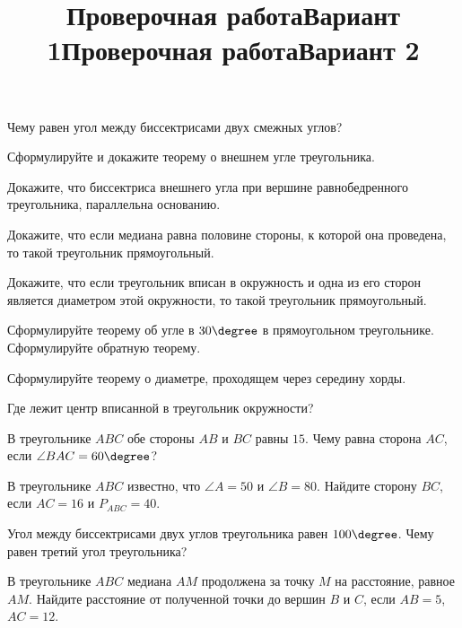 \newpage
\title{Проверочная работа}
\title{Вариант 1}
\begin{listofex}
	\item
	\begin{enumcols}[itemcolumns=1]
		\item Чему равен угол между биссектрисами двух смежных углов?
		\item Сформулируйте и докажите теорему о внешнем угле треугольника.
		\item Докажите, что биссектриса внешнего угла при вершине равнобедренного треугольника, параллельна основанию.
		\item Докажите, что если медиана равна половине стороны, к которой она проведена, то такой треугольник прямоугольный.
		\item Докажите, что если треугольник вписан в окружность и одна из его сторон является диаметром этой окружности, то такой треугольник прямоугольный.
		\item Сформулируйте теорему об угле в \( 30\degree \) в прямоугольном треугольнике. Сформулируйте обратную теорему.
		\item Сформулируйте теорему о диаметре, проходящем через середину хорды.
		\item Где лежит центр вписанной в треугольник окружности?
	\end{enumcols}
	\item В треугольнике \( ABC \) обе стороны \( AB \) и \( BC \) равны \( 15 \). Чему равна сторона \( AC \), если \( \angle BAC = 60 \degree \)?
	\item В треугольнике \( ABC \) известно, что \( \angle A = 50 \) и \( \angle B = 80 \). Найдите сторону \( BC \), если \( AC = 16 \) и \( P_{ABC}=40 \).
	\item Угол между биссектрисами двух углов треугольника равен \( 100\degree \). Чему равен третий угол треугольника?
	\item {}
	\item {}
	\item В треугольнике \( ABC \) медиана \( AM \) продолжена за точку \( M \) на расстояние, равное \( AM \). Найдите расстояние от полученной точки до вершин \( B  \) и \( C\), если \( AB = 5\), \( AC = 12\).
	\item {}
\end{listofex}
\newpage
\title{Проверочная работа}
\title{Вариант 2}

